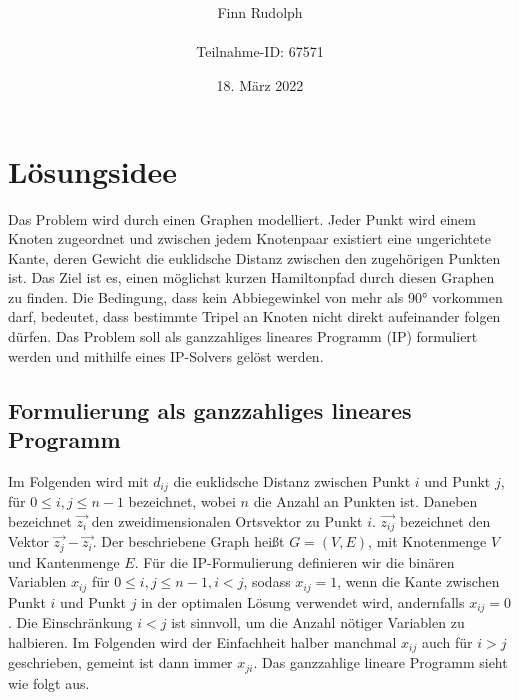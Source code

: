 \documentclass[a4paper, 10pt, ngerman]{article}
\title{\LARGE \textbf{\Aufgabe}}
\author{\large Finn Rudolph \\ \\ \large Teilnahme-ID: 67571}
\date{\large 18. März 2022}
\begin{document}
\begin{titlepage}
    \maketitle
    \tableofcontents
    \thispagestyle{empty}
\end{titlepage}

\newtheorem{theorem}{Satz}
\newtheorem{lemma}{Lemma}
\theoremstyle{definition}
\newtheorem{definition}{Definition}

\section{Lösungsidee}

Das Problem wird durch einen Graphen modelliert. Jeder Punkt wird einem Knoten zugeordnet und zwischen jedem Knotenpaar existiert eine ungerichtete Kante, deren Gewicht die euklidsche Distanz zwischen den zugehörigen Punkten ist. Das Ziel ist es, einen möglichst kurzen Hamiltonpfad durch diesen Graphen zu finden. Die Bedingung, dass kein Abbiegewinkel von mehr als 90° vorkommen darf, bedeutet, dass bestimmte Tripel an Knoten nicht direkt aufeinander folgen dürfen. Das Problem soll als ganzzahliges lineares Programm (IP) formuliert werden und mithilfe eines IP-Solvers gelöst werden.

\subsection{Formulierung als ganzzahliges lineares Programm}

Im Folgenden wird mit $d_{ij}$ die euklidsche Distanz zwischen Punkt $i$ und Punkt $j$, für $0 \le i, j \le n - 1$ bezeichnet, wobei $n$ die Anzahl an Punkten ist. Daneben bezeichnet $\vec{z_i}$ den zweidimensionalen Ortsvektor zu Punkt $i$. $\vec{z_{ij}}$ bezeichnet den Vektor $\vec{z_j} - \vec{z_i}$. Der beschriebene Graph heißt $G = (V, E)$, mit Knotenmenge $V$ und Kantenmenge $E$. Für die IP-Formulierung definieren wir die binären Variablen $x_{ij}$ für $0 \le i, j \le n - 1, i < j$, sodass $x_{ij} = 1$, wenn die Kante zwischen Punkt $i$ und Punkt $j$ in der optimalen Lösung verwendet wird, andernfalls $x_{ij} = 0$. Die Einschränkung $i < j$ ist sinnvoll, um die Anzahl nötiger Variablen zu halbieren. Im Folgenden wird der Einfachheit halber manchmal $x_{ij}$ auch für $i > j$ geschrieben, gemeint ist dann immer $x_{ji}$. Das ganzzahlige lineare Programm sieht wie folgt aus.
\end{document}
